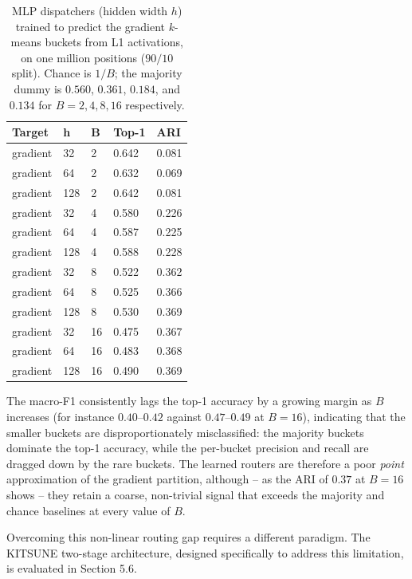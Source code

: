 \begin{table}[H]
\centering
\small
\begin{tabular}{lllll}
\toprule
Target & h & B & Top-1 & ARI \\
\midrule
gradient & 32 & 2 & 0.642 & 0.081 \\
gradient & 64 & 2 & 0.632 & 0.069 \\
gradient & 128 & 2 & 0.642 & 0.081 \\
gradient & 32 & 4 & 0.580 & 0.226 \\
gradient & 64 & 4 & 0.587 & 0.225 \\
gradient & 128 & 4 & 0.588 & 0.228 \\
gradient & 32 & 8 & 0.522 & 0.362 \\
gradient & 64 & 8 & 0.525 & 0.366 \\
gradient & 128 & 8 & 0.530 & 0.369 \\
gradient & 32 & 16 & 0.475 & 0.367 \\
gradient & 64 & 16 & 0.483 & 0.368 \\
gradient & 128 & 16 & 0.490 & 0.369 \\
\bottomrule
\end{tabular}
\caption{MLP dispatchers (hidden width $h$) trained to predict the gradient $k$-means buckets from L1 activations, on one million positions ($90/10$ split). Chance is $1/B$; the majority dummy is $0.560$, $0.361$, $0.184$, and $0.134$ for $B=2,4,8,16$ respectively.}
\label{tab:5.7}
\end{table}


The macro-F1 consistently lags the top-1 accuracy by a growing margin as $B$ increases (for instance $0.40$--$0.42$ against $0.47$--$0.49$ at $B=16$), indicating that the smaller buckets are disproportionately misclassified: the majority buckets dominate the top-1 accuracy, while the per-bucket precision and recall are dragged down by the rare buckets. The learned routers are therefore a poor \emph{point} approximation of the gradient partition, although -- as the ARI of $0.37$ at $B=16$ shows -- they retain a coarse, non-trivial signal that exceeds the majority and chance baselines at every value of $B$.

Overcoming this non-linear routing gap requires a different paradigm. The KITSUNE two-stage architecture, designed specifically to address this limitation, is evaluated in Section 5.6.

